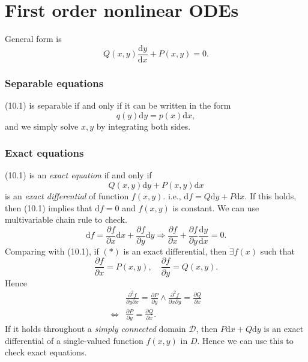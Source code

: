 \documentclass[10pt]{article}
\def\d{{\mathrm d}}
\begin{document}
    \part{First order nonlinear ODEs}
    General form is 
    \begin{equation}
        Q(x,y)\frac{\mathrm{d}y}{\mathrm{d}x}+P(x,y)=0.
    \end{equation}
    \section{Separable equations}
    (10.1) is separable if and only if it can be written in the form 
    \[
        q(y)\d y=p(x)\d x,
    \]
    and we simply solve $x,y$ by integrating both sides.
    \section{Exact equations}
    (10.1) is an \textit{exact equation} if and only if 
    \[
        Q(x,y)\d y+P(x,y)\d x\tag{*}
    \]
    is an \textit{exact differential} of function $f(x,y)$. i.e., $ \d f= Q\d y+P\d x $. If this holds, then (10.1) implies that $ \d f=0 $ and $f(x,y)$ is constant. We can use multivariable chain rule to check.
    \[
        \d f=\frac{\partial f}{\partial x}\d x+ \frac{\partial f}{\partial y}\d y \Longrightarrow \frac{\partial f}{\partial x}+\frac{\partial f}{\partial y}\frac{\mathrm{d}y}{\mathrm{d}x}=0     
    .\]
    Comparing with (10.1), if $(*)$ is an exact differential, then $\exists f(x)$ such that 
    \[
        \frac{\partial f}{\partial x}=P(x,y),\quad \frac{\partial f}{\partial y}=Q(x,y)  \tag{**}
    .\]
    Hence 
    \[
        \begin{aligned}
             & \frac{\partial^2 f}{\partial y\partial x} =\frac{\partial P}{\partial y} \land  \frac{\partial^2 f}{\partial x\partial y} =\frac{\partial Q}{\partial x}\\
             \Longleftrightarrow & \boxed{\frac{\partial P}{\partial y}=\frac{\partial Q}{\partial x}}.
        \end{aligned}
    \]
    If it holds throughout a \textit{simply connected} domain $\mathcal{D}$, then $ P\d x+Q\d y $ is an exact differential of a single-valued function $f(x,y)$ in $D$. Hence we can use this to check exact equations.
\end{document}
